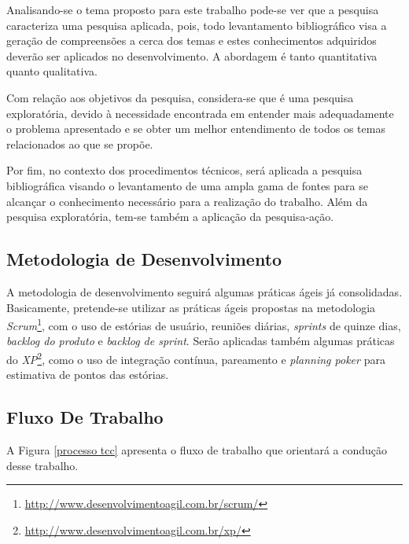Analisando-se o tema proposto para este trabalho pode-se ver que a pesquisa caracteriza uma pesquisa aplicada, pois, todo levantamento bibliográfico visa a geração de compreensões a cerca dos temas e estes conhecimentos adquiridos deverão ser aplicados no desenvolvimento. A abordagem é tanto quantitativa quanto qualitativa.

Com relação aos objetivos da pesquisa, considera-se que é uma pesquisa exploratória, devido à necessidade encontrada em entender mais adequadamente o problema apresentado e se obter um melhor entendimento de todos os temas relacionados ao que se propõe.

Por fim, no contexto dos procedimentos técnicos, será aplicada a pesquisa bibliográfica visando o levantamento de uma ampla gama de fontes para se alcançar o conhecimento necessário para a realização do trabalho. Além da pesquisa exploratória, tem-se também a aplicação da pesquisa-ação.

\subsection{Metodologia de Desenvolvimento}

A metodologia de desenvolvimento seguirá algumas práticas ágeis já consolidadas. Basicamente, pretende-se utilizar as práticas ágeis propostas na metodologia \textit{Scrum}\footnote{\url{http://www.desenvolvimentoagil.com.br/scrum/}}, com o uso de estórias de usuário, reuniões diárias, \textit{sprints} de quinze dias, \textit{backlog do produto} e \textit{backlog de sprint}. Serão aplicadas também algumas práticas do \textit{XP}\footnote{\url{http://www.desenvolvimentoagil.com.br/xp/}}, como o uso de integração contínua, pareamento e \textit{planning poker} para estimativa de pontos das estórias.

\subsection{Fluxo De Trabalho}

A Figura \ref{processo tcc} apresenta o fluxo de trabalho que orientará a condução desse trabalho.


